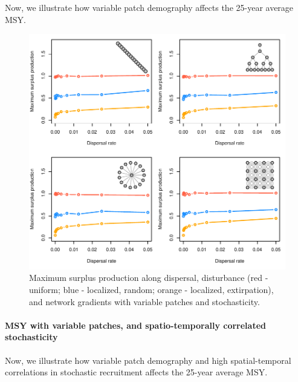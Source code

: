 \documentclass[]{article}
\let\oldparagraph\paragraph
\renewcommand{\paragraph}[1]{\oldparagraph{#1}\mbox{}}
\begin{document}
Now, we illustrate how variable patch demography affects the 25-year
average MSY.

\begin{figure}[H]

{\centering \includegraphics{Managing_for_ecological_surprises_in_metapopulations_files/figure-latex/MSY with variable patches and stochasticity-1} 

}

\caption{Maximum surplus production along dispersal, disturbance (red - uniform; blue - localized, random; orange - localized, extirpation), and network gradients with variable patches and stochasticity.}\label{fig:MSY with variable patches and stochasticity}
\end{figure}
\newpage

\hypertarget{msy-with-variable-patches-and-spatio-temporally-correlated-stochasticity}{%
\paragraph{MSY with variable patches, and spatio-temporally correlated
stochasticity}\label{msy-with-variable-patches-and-spatio-temporally-correlated-stochasticity}}

Now, we illustrate how variable patch demography and high
spatial-temporal correlations in stochastic recruitment affects the
25-year average MSY.
\end{document}
